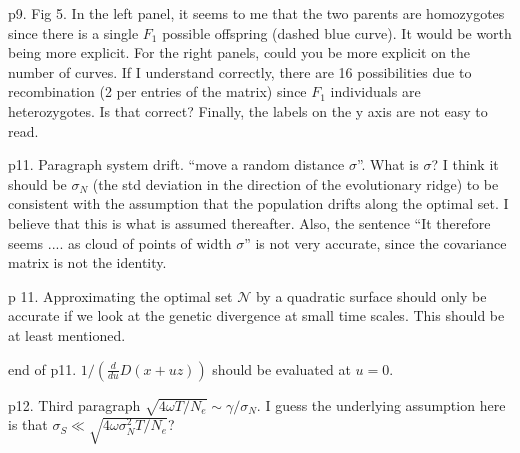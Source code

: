 \begin{point}{p9. Fig 5.} 
    In the left panel, it seems to me that the two parents are homozygotes since there
is a single $F_1$ possible offspring (dashed blue curve). It would be worth being more explicit.
For the right panels, could you be more explicit on the number of curves. If I understand
correctly, there are 16 possibilities due to recombination (2 per entries of the matrix) since
$F_1$ individuals are heterozygotes. Is that correct?
Finally, the labels on the y axis are not easy to read.
\end{point}


\begin{point}{p11. Paragraph system drift.}
    ``move a random distance $\sigma$''. What is $\sigma$? I think it should
be $\sigma_N$ (the std deviation in the direction of the evolutionary ridge) to be consistent with
the assumption that the population drifts along the optimal set. I believe that this is what
is assumed thereafter. Also, the sentence ``It therefore seems .... as cloud of points of width
$\sigma$'' is not very accurate, since the covariance matrix is not the identity.
\end{point}


\begin{point}{p 11.}
    Approximating the optimal set $\mathcal{N}$ by a quadratic surface should only be accurate if
we look at the genetic divergence at small time scales. This should be at least mentioned.
\end{point}


\begin{point}{end of p11.}
    $1/( \frac{d}{du} D(x + uz))$ should be evaluated at $u = 0$.
\end{point}


\begin{point}{p12. Third paragraph}
    $\sqrt{4 \omega T/N_e} \sim \gamma/\sigma_N$.
    I guess the underlying assumption here is that
    $\sigma_S \ll \sqrt{4 \omega \sigma^2_N T/N_e}$?
\end{point}

